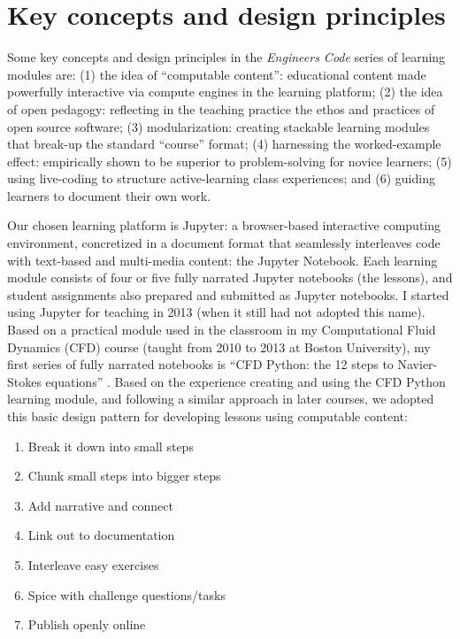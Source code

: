 \documentclass[10pt,journal,compsoc]{IEEEtran}
\begin{document}
\section{Key concepts and design principles}

Some key concepts and design principles in the \emph{Engineers Code} series of learning modules are: 
(1) the idea of ``computable content'': educational content made powerfully interactive via compute engines in the learning platform; 
(2) the idea of open pedagogy: reflecting in the teaching practice the ethos and practices of open source software; 
(3) modularization: creating stackable learning modules that break-up the standard ``course'' format; 
(4) harnessing the worked-example effect: empirically shown to be superior to problem-solving for novice learners; 
(5) using live-coding to structure active-learning class experiences; and
(6) guiding learners to document their own work. 

Our chosen learning platform is Jupyter: a browser-based interactive computing environment, concretized in a document format that seamlessly interleaves code with text-based and multi-media content: the Jupyter Notebook. 
Each learning module consists of four or five fully narrated Jupyter notebooks (the lessons), and student assignments also prepared and submitted as Jupyter notebooks.
I started using Jupyter for teaching in 2013 (when it still had not adopted this name). 
Based on a practical module used in the classroom in my Computational Fluid Dynamics (CFD) course (taught from 2010 to 2013 at Boston University), my first series of fully narrated notebooks is ``CFD Python: the 12 steps to Navier-Stokes equations'' \cite{BarbaForsyth2018}. 
Based on the experience creating and using the CFD Python learning module, and following a similar approach in later courses, we adopted this basic design pattern for developing lessons using computable content:

\begin{enumerate}
\item Break it down into small steps
\item Chunk small steps into bigger steps
\item Add narrative and connect
\item Link out to documentation
\item Interleave easy exercises
\item Spice with challenge questions/tasks
\item Publish openly online
\end{enumerate}
\end{document}
